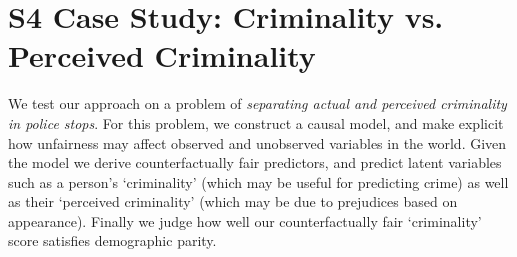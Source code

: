 
%

\section*{S4 Case Study: Criminality vs. Perceived Criminality}
\label{sec:true-vs.-perceived}

We test our approach on a problem of \emph{separating actual and
  perceived criminality in police stops}. For this problem, we
construct a causal model, and make explicit how unfairness may affect
observed and unobserved variables in the world. Given the model we
derive counterfactually fair predictors, and predict latent variables
such as a person's `criminality' (which may be useful for predicting
crime) as well as their `perceived criminality' (which may be due to
prejudices based on appearance). Finally we judge how well our
counterfactually fair `criminality' score satisfies demographic
parity.

